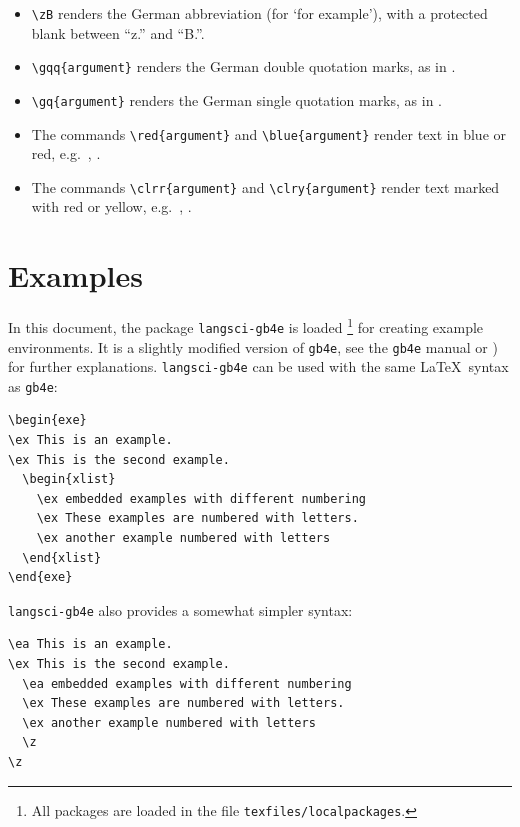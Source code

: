 \begin{itemize}
	\item \verb|\zB| renders the German abbreviation \zB (for `for example'), with a protected blank between ``z.'' and ``B.''.
	
	\item \verb||  renders the German double quotation marks, as in \gqq{argument}.
	
	\item \verb||  renders the German single quotation marks, as in \gq{argument}.
	
	\item The commands \verb|\red{argument}| and \verb|\blue{argument}| render text in blue or red, e.g.\ , .
	
	\item The commands \verb|\clrr{argument}| and \verb|\clry{argument}| render text marked with red  or yellow, e.g.\ , .
\end{itemize}


\section{Examples}
\label{ch:Examples}


In this document, the package \texttt{langsci-gb4e} is loaded%
	\footnote{All packages are loaded in the file \texttt{texfiles/localpackages}.} %
for creating example environments.
It is a slightly modified version of \texttt{gb4e}, see the \texttt{gb4e} manual \citep{Kolb&Co10a} or \citet{Freitag&MyP15a}) for further explanations.
\texttt{langsci-gb4e} can be used with the same \LaTeX \ syntax as \texttt{gb4e}:


\begin{lstlisting}
\begin{exe}
\ex This is an example.
\ex This is the second example.
  \begin{xlist}
    \ex embedded examples with different numbering
    \ex These examples are numbered with letters.
    \ex another example numbered with letters
  \end{xlist}
\end{exe}
\end{lstlisting}


\noindent \texttt{langsci-gb4e} also provides a somewhat simpler syntax:

\begin{lstlisting}
\ea This is an example.
\ex This is the second example.
  \ea embedded examples with different numbering
  \ex These examples are numbered with letters.
  \ex another example numbered with letters
  \z   
\z
\end{lstlisting}


